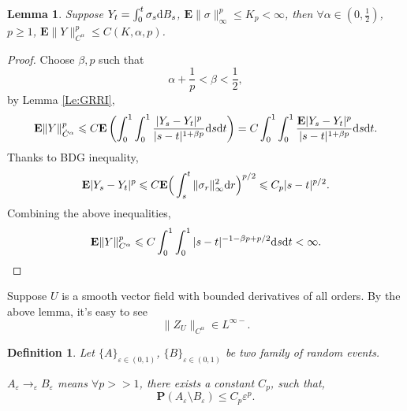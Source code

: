 \documentclass[twoside, 12pt]{book}
\numberwithin{equation}{chapter}
\newtheorem{lemma}[theorem]{Lemma}
\newtheorem{definition}[theorem]{Definition}
\def\bE{{\mathbf E}}
\def\bP{{\mathbf P}}
\def\geq{\geqslant}
\def\leq{\leqslant}
\def\d{\text{\rm{d}}}
\def\eps{\varepsilon}
\begin{document}
	\begin{lemma}
	Suppose $Y_t=\int_0^t \sigma_s\d B_s$, $\bE  \|\sigma\|_\infty^p\leq K_p<\infty$, then $\forall \alpha \in(0,\frac{1}{2})$, $p\geq 1$, $\bE  \|Y\|_{C^\alpha }^p\leq C(K,\alpha ,p)$. 
	\end{lemma}
	\begin{proof}
		Choose $\beta, p$ such that
		$$\alpha +\frac{1}{p}<\beta<\frac{1}{2},$$
		by Lemma \ref{Le:GRRI}, 
		$$\bE  \|Y\|^p_{\dot C^\alpha } \leq C \bE \left(\int_0^1\int_0^1 \frac{|Y_s-Y_t|^p}{|s-t|^{1+\beta p}}\d s\d t\right)= C\int_0^1\int_0^1 \frac{\bE  |Y_s-Y_t|^p}{|s-t|^{1+\beta p}}\d s\d t. $$
		Thanks to BDG inequality, 
		$$\bE  |Y_s-Y_t|^p\leq C \bE \Big(\int_s^t \|\sigma_r\|_\infty^2\d r\Big )^{p/2}\leq C_p|s-t|^{p/2}.$$
		Combining the above inequalities,  
		$$\bE  \|Y\|^p_{C^\alpha }\leq C \int_0^1 \int_0^1  |s-t|^{-1-\beta p+p/2}\d s\d t<\infty. $$
	\end{proof}
	
	Suppose $U$ is a smooth vector field with bounded derivatives of all orders. By the above lemma, it's easy to see
	$$\|Z_U\|_{C^\alpha }\in L^{\infty-}. $$
	
	
	\begin{definition}
	Let $\{A\}_{\eps\in(0,1)}$, $\{B\}_{\eps\in(0,1)}$ be two family of random events. 
	
	$A_\eps \rightarrow_\eps B_\eps$ means $\forall p>>1$, there exists a constant $C_p$, such that, 
	$$\bP (A_\eps\setminus B_\eps)\leq C_p\eps^p. $$
	\end{definition}
	
\end{document}
